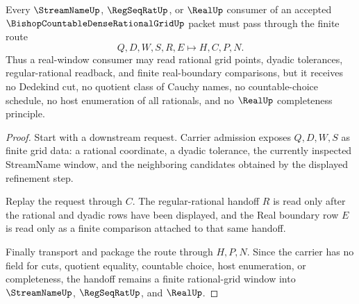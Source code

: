 \begin{theorem}
\label{thm:bishop-countable-dense-rational-grid-real-window-handoff}
Every $\StreamNameUp$, $\RegSeqRatUp$, or $\RealUp$ consumer of an accepted $\BishopCountableDenseRationalGridUp$ packet must pass through the finite route
$$
Q,D,W,S,R,E \longmapsto H,C,P,N .
$$
Thus a real-window consumer may read rational grid points, dyadic tolerances, regular-rational readback, and finite real-boundary comparisons, but it receives no Dedekind cut, no quotient class of Cauchy names, no countable-choice schedule, no host enumeration of all rationals, and no $\RealUp$ completeness principle.
\end{theorem}
\begin{proof}
Start with a downstream request. Carrier admission exposes $Q,D,W,S$ as finite grid data: a rational coordinate, a dyadic tolerance, the currently inspected StreamName window, and the neighboring candidates obtained by the displayed refinement step.

Replay the request through $C$. The regular-rational handoff $R$ is read only after the rational and dyadic rows have been displayed, and the Real boundary row $E$ is read only as a finite comparison attached to that same handoff.

Finally transport and package the route through $H,P,N$. Since the carrier has no field for cuts, quotient equality, countable choice, host enumeration, or completeness, the handoff remains a finite rational-grid window into $\StreamNameUp$, $\RegSeqRatUp$, and $\RealUp$.
\end{proof}

\begin{closurestatus}{\BishopCountableDenseRationalGridUp}
  \theoryclosure{\seedClosure}
  \formalstatus{\unformalizedV}
\end{closurestatus}
